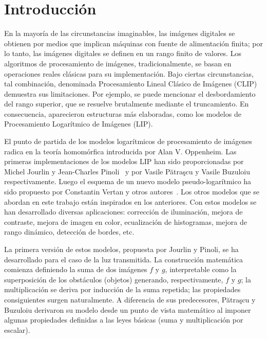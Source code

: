 \chapter*{Introducción}\label{chapter:introduction}

En la mayoría de las circunstancias imaginables, las imágenes digitales se obtienen por medios que implican máquinas con fuente de alimentación finita; por lo tanto, las imágenes digitales se definen en un rango finito de valores. Los algoritmos de procesamiento de imágenes, tradicionalmente, se basan en operaciones reales clásicas para su implementación. Bajo ciertas circunstancias, tal combinación, denominada Procesamiento Lineal Clásico de Imágenes (CLIP) demuestra sus limitaciones. Por ejemplo, se puede mencionar el desbordamiento del rango superior, que se resuelve brutalmente mediante el truncamiento. En consecuencia, aparecieron estructuras más elaboradas, como los modelos de Procesamiento Logarítmico de Imágenes (LIP).

El punto de partida de los modelos logarítmicos de procesamiento de imágenes radica en la teoría homomórfica introducida por Alan V. Oppenheim. Las primeras implementaciones de los modelos LIP han sido proporcionadas por Michel Jourlin y Jean-Charles Pinoli~\cite{jourlin1988model} y por Vasile Pătraşcu y Vasile Buzuloiu~\cite{patrascu2014mathematical} respectivamente. Luego el esquema de un nuevo modelo pseudo-logarítmico ha sido propuesto por Constantin Vertan y otros autores~\cite{vertan2008pseudo}. Los otros modelos que se abordan en este trabajo est\'an inspirados en los anteriores. Con estos modelos se han desarrollado diversas aplicaciones: corrección de iluminación, mejora de contraste, mejora de imagen en color, ecualización de histogramas, mejora de rango dinámico, detección de bordes, etc.

La primera versi\'on de estos modelos, propuesta por Jourlin y Pinoli, se ha desarrollado para el caso de la luz transmitida. La construcción matemática comienza definiendo la suma de dos imágenes $f$ y $g$, interpretable como la superposición de los obstáculos (objetos) generando, respectivamente, $f$ y $g$; la multiplicación se deriva por inducción de la suma repetida; las propiedades consiguientes surgen naturalmente. A diferencia de sus predecesores, Pătraşcu y Buzuloiu derivaron su modelo desde un punto de vista matemático al imponer algunas propiedades definidas a las leyes básicas (suma y multiplicación por escalar).

